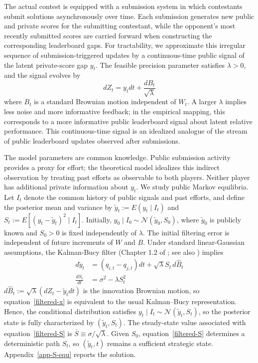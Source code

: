 \documentclass[mnsc]{informs3}
\begin{document}
The actual contest is equipped with a submission system in which contestants submit solutions asynchronously over time. Each submission generates new public and private scores for the submitting contestant, while the opponent's most recently submitted scores are carried forward when constructing the corresponding leaderboard gaps.
For tractability, we approximate this irregular sequence of submission-triggered updates by a continuous-time public signal of the {\color{black}latent private-score gap} $y_t$.
The feasible precision parameter satisfies $\lambda>0$, and the signal evolves by
\begin{equation}\label{signal}
	dZ_{t} = y_{t}dt + \frac{dB_{t}}{\sqrt{\lambda}}
\end{equation}
where $B_{t}$ is a standard Brownian motion independent of $W_t$.
A larger $\lambda$ implies less noise and more informative feedback; in the empirical mapping, this corresponds to a more informative public leaderboard signal about latent relative performance.
This continuous-time signal is an idealized analogue of the stream of public leaderboard updates observed after submissions.

{
The model parameters are common knowledge. Public submission activity provides a proxy for effort; the theoretical model idealizes this indirect observation by treating past efforts as observable to both players. Neither player has additional private information about $y_t$. We study public Markov equilibria. Let $I_t$ denote the common history of public signals and past efforts, and define the posterior mean and variance by $\tilde y_t:=E(y_t\mid I_t)$ and $S_t:=E[(y_t-\tilde y_t)^2\mid I_t]$. Initially, $y_0\mid I_0\sim\mathcal N(\tilde y_0,S_0)$, where $\tilde y_0$ is publicly known and $S_0>0$ is fixed independently of $\lambda$. The initial filtering error is independent of future increments of $W$ and $B$.
}
Under standard linear-Gaussian assumptions, the Kalman-Bucy filter (Chapter 1.2 of \citealt{Bensoussan1992Control}; see also \citealt{frogerais2012various,barrau2017invariant}) implies
\begin{align}
	{d\tilde{y}_{t}} &{= (q_{i,t}-q_{j,t})dt + \sqrt{\lambda}S_{t}\,d\widehat B_t}
	\label{filtered-x}\\
	\frac{dS_{t}}{dt} &= \sigma^2 - \lambda S_{t}^2
	\label{filtered-S}
\end{align}
{$d\widehat B_t:=\sqrt{\lambda}(dZ_t-\tilde y_tdt)$ is the innovation Brownian motion, so equation~\eqref{filtered-x} is equivalent to the usual Kalman--Bucy representation.}
Hence, the conditional distribution satisfies $y_t \mid I_t \sim \mathcal{N}(\tilde{y}_t,S_t)$, so the posterior state is fully characterized by $(\tilde y_t,S_t)$.
{The steady-state value associated with equation~\eqref{filtered-S} is $\bar S \equiv \sigma/\sqrt{\lambda}$.}
{Given $S_0$, equation~\eqref{filtered-S} determines a deterministic path $S_t$, so $(\tilde y_t,t)$ remains a sufficient strategic state. Appendix~\ref{app-S-equ} reports the solution.}
\end{document}
